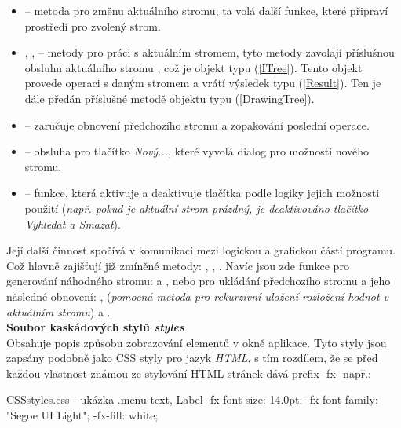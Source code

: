 \documentclass[
  biblatex=false,
  font=serif,
  glossaries=false,
  tables=false,
  theorems=false,
  index
]{kidiplom}
\begin{document}
\begin{itemize}
\item {} -- metoda pro změnu aktuálního stromu, ta volá další funkce, které připraví prostředí pro zvolený strom.

\item {},  ,  \label{zakladniMetody} -- metody pro práci s aktuálním stromem, tyto metody zavolají příslušnou obsluhu aktuálního stromu , což je objekt typu  (\ref{ITree}). Tento objekt provede operaci s daným stromem a vrátí výsledek typu  (\ref{Result}). Ten je dále předán příslušné metodě objektu  typu  (\ref{DrawingTree}).

\item {} -- zaručuje obnovení předchozího stromu a zopakování poslední operace.

\item {} -- obsluha pro tlačítko \textit{Nový...}, které vyvolá dialog pro možnosti nového stromu.

\item {} -- funkce, která aktivuje a deaktivuje tlačítka podle logiky jejich možnosti použití (\textit{např. pokud je aktuální strom prázdný, je deaktivováno tlačítko Vyhledat a Smazat}).
\end{itemize}

\indent Její další činnost spočívá v komunikaci mezi logickou a grafickou částí programu. Což hlavně zajišťují již zmíněné metody: ,  , . Navíc jsou zde funkce pro generování náhodného stromu:  a , nebo pro ukládání předchozího stromu a jeho následné obnovení: ,  (\textit{pomocná metoda pro rekurzivní uložení rozložení hodnot v aktuálním stromu}) a .\\

\noindent \textbf{Soubor kaskádových stylů \textit{styles}}\\
\indent Obsahuje popis způsobu zobrazování elementů v okně aplikace. Tyto styly jsou zapsány podobně jako CSS styly pro jazyk \textit{HTML}, s tím rozdílem, že se před každou vlastnost známou ze stylování HTML stránek dává prefix -fx- např.:
\begin{kicode}{CSS}{}{styles.css - ukázka}
.menu-text, Label  {
    -fx-font-size: 14.0pt;
    -fx-font-family: "Segoe UI Light";
    -fx-fill: white;
}
\end{kicode}
\end{document}
